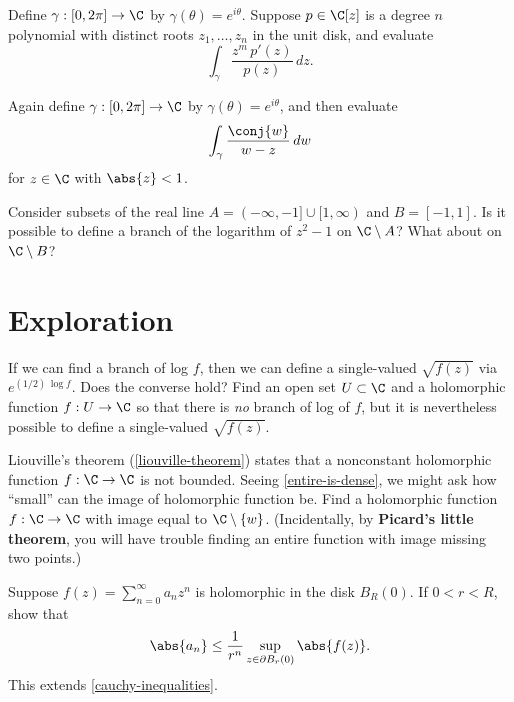 \documentclass{homework}
\begin{document}
\begin{problem}
  Define $\gamma : [0,2\pi] \to \C$ by $\gamma(\theta) = e^{i\theta}$.
  Suppose $p \in \C[z]$ is a degree $n$ polynomial with distinct roots
  $z_1,\ldots,z_n$ in the unit disk, and evaluate
  \[
    \int_\gamma \frac{z^m \, p'(z)}{p(z)} \, dz.
  \]
\end{problem}

\begin{problem}
  Again define $\gamma : [0,2\pi] \to \C$ by
  $\gamma(\theta) = e^{i\theta}$, and then evaluate
  \[
    \int_\gamma \frac{\conj{w}}{w - z} \, dw
  \] for $z \in \C$ with $\abs{z} < 1$.
\end{problem}

\begin{problem}
  Consider subsets of the real line $A = (-\infty,-1] \cup [1,\infty)$
  and $B = [-1,1]$.  Is it possible to define a branch of the
  logarithm of $z^2 - 1$ on $\C \setminus A$?  What about on
  $\C \setminus B$?
\end{problem}

\section{Exploration}

\begin{problem}
  If we can find a branch of log $f$, then we can define a
  single-valued $\sqrt{f(z)}$ via $e^{(1/2) \, \log f}$.  Does the
  converse hold?  Find an open set $U \subset \C$ and a holomorphic
  function $f : U \to \C$ so that there is \textit{no} branch of log
  of $f$, but it is nevertheless possible to define a single-valued
  $\sqrt{f(z)}$.
\end{problem}

\begin{problem}
  Liouville's theorem (\ref{liouville-theorem}) states that a
  nonconstant holomorphic function $f : \C \to \C$ is not bounded.
  Seeing \ref{entire-is-dense}, we might ask how ``small'' can the
  image of holomorphic function be.  Find a holomorphic function
  $f : \C \to \C$ with image equal to $\C \setminus \{w\}$.
  (Incidentally, by \textbf{Picard's little theorem}, you will have
  trouble finding an entire function with image missing two points.)
\end{problem}

\begin{problem}\label{cauchy-inequalities-2}Suppose
  $f(z) = \sum_{n=0}^\infty a_n z^n$ is holomorphic in the disk
  $B_R(0)$.  If $0 < r < R$, show that
  \[
    \abs{a_n} \leq \frac{1}{r^n} \displaystyle\sup_{z \in \partial B_r(0)} \abs{f(z)}.
  \]
  This extends \ref{cauchy-inequalities}.
\end{problem}
\end{document}
